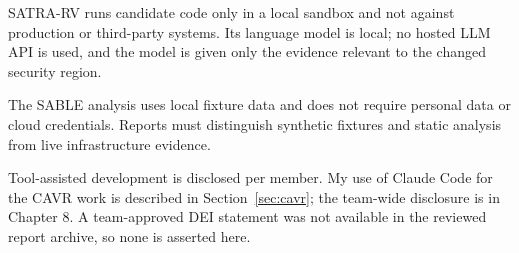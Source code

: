 \begin{sloppypar}
SATRA-RV runs candidate code only in a local sandbox and not against production or third-party systems. Its language model is local; no hosted LLM API is used, and the model is given only the evidence relevant to the changed security region.
\end{sloppypar}

\begin{sloppypar}
The SABLE analysis uses local fixture data and does not require personal data or cloud credentials. Reports must distinguish synthetic fixtures and static analysis from live infrastructure evidence.
\end{sloppypar}

\begin{sloppypar}
Tool-assisted development is disclosed per member. My use of Claude Code for the CAVR work is described in Section~\ref{sec:cavr}; the team-wide disclosure is in Chapter 8. A team-approved DEI statement was not available in the reviewed report archive, so none is asserted here.
\end{sloppypar}
